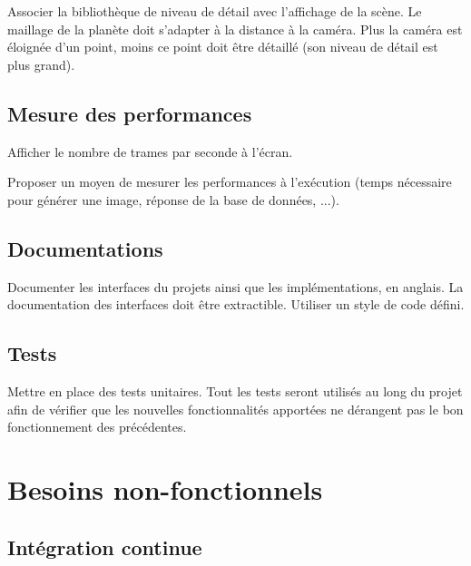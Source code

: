 \documentclass[12pt]{report}
\begin{document}
Associer la bibliothèque de niveau de détail avec l'affichage de la scène. Le maillage de la planète doit s'adapter à la distance à la caméra. Plus la caméra est éloignée d'un point, moins ce point doit être détaillé (son niveau de détail est plus grand).

\subsection{Mesure des performances}

Afficher le nombre de trames par seconde à l'écran.

Proposer un moyen de mesurer les performances à l’exécution (temps nécessaire pour générer une image, réponse de la base de données, ...).


\subsection{Documentations}

Documenter les interfaces du projets ainsi que les implémentations, en anglais. La documentation des interfaces doit être extractible.
Utiliser un style de code défini.


\subsection{Tests}

Mettre en place des tests unitaires. Tout les tests  seront utilisés au long du projet afin de vérifier que les nouvelles fonctionnalités apportées ne dérangent pas le bon fonctionnement des précédentes.


\newpage

\section{Besoins non-fonctionnels}
\subsection{Intégration continue}
\end{document}
